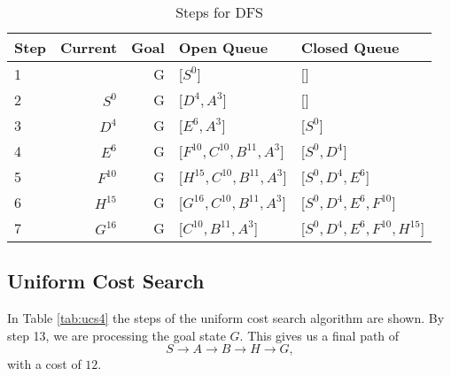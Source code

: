 \documentclass{article}
\begin{document}
    \begin{table}[!htp]\centering
        \caption{Steps for DFS}\label{tab:dfs4}
        \scriptsize
        \begin{tabular}{lrrll}\toprule
        Step &Current&Goal& Open Queue &Closed Queue  \\\midrule
        1&  &G &[$S^0$] &[] \\
        2& $S^0$ &G &[$D^4, A^3$] &[] \\
        3& $D^4$ &G &[$E^6, A^3$] &[$S^0$] \\
        4& $E^6$ &G &[$F^{10}, C^{10}, B^{11}, A^3$] &[$S^0, D^4$] \\
        5& $F^{10}$ &G &[$H^{15},C^{10}, B^{11}, A^3$] &[$S^0, D^4, E^{6}$] \\
        6& $H^{15}$ &G &[$G^{16},C^{10}, B^{11}, A^3$] &[$S^0, D^4, E^{6}, F^{10}$] \\
        7& $G^{16}$ &G &[$C^{10}, B^{11}, A^3$] &[$S^0, D^4, E^{6}, F^{10}, H^{15}$] \\

        \end{tabular}
    \end{table}




\subsection{Uniform Cost Search}

    In Table \ref{tab:ucs4} the steps of the uniform cost search algorithm are shown. 
    By step 13, we are processing the goal state $G$. This gives us a final path of
    \begin{equation}
        S \rightarrow A \rightarrow B \rightarrow H \rightarrow G,
    \end{equation}
    with a cost of $12$.
\end{document}
